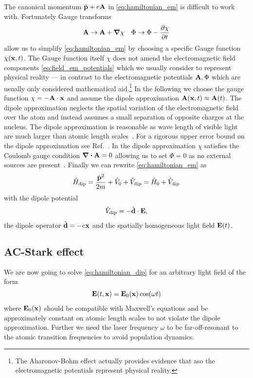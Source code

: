The canonical momentum $\hat{\vb{p}}+e\vb{A}$ in \cref{eq:hamiltonian_em} is
difficult to work with. Fortunately Gauge transforms
\begin{align}
  \vb{A}\to\vb{A}+\grad{\chi}
  &&
  \Phi\to\Phi-\pdv{\chi}{t}
  \label{eq:gauge_transform_em}
\end{align}
allow us to simplify \cref{eq:hamiltonian_em} by choosing a specific Gauge
function $\chi(\vb{x},t)$. The Gauge function itself $\chi$ does not amend the
electromagnetic field components \cref{eq:field_em_potentials} which we
usually consider to represent physical reality --- in contrast to the
electromagnetic potentials $\vb{A},\Phi$ which are usually only considered
mathematical aid.\footnote{The Aharonov-Bohm effect actually provides evidence
that aso the electromagnetic potentials represent physical reality.} In the
following we choose the gauge function $\chi=-\vb{A}\cdot\vb{x}$ and assume
the dipole approximation $\vb{A}(\vb{x},t)\approx\vb{A}(t)$. The dipole
approximation neglects the spatial variation of the electromagnetic field
over the atom and instead assumes a small separation of opposite charges at
the nucleus. The dipole approximation is reasonable as wave length of visible
light are much larger than atomic length scales~\cite{Gerry2004}. For a
rigorous upper error bound on the dipole approximation see
Ref.~\cite{Bossmann2016}. In the dipole approximation $\chi$ satisfies the
Coulomb gauge condition $\divergence{\vb{A}}=0$ allowing us to set $\Phi=0$
as no external sources are present~\cite{Jackson2005}. Finally we can rewrite
\cref{eq:hamiltonian_em} as
\begin{equation}
  \hat{H}_\text{dip}
  =\frac{\hat{\vb{p}}^2}{2m}+\hat{V}_0+\hat{V}_\text{dip}
  =\hat{H}_0+\hat{V}_\text{dip}
  \label{eq:hamiltonian_dip}
\end{equation}
with the dipole potential
\begin{equation}
  \hat{V}_\text{dip}
  =-\hat{\vb{d}}\cdot\vb{E}
  \label{eq:potential_dip},
\end{equation}
the dipole operator $\hat{\vb{d}}=-e\vb{x}$ and the spatially homogeneous
light field $\vb{E}(t)$.

\subsection{AC-Stark effect}

We are now going to solve \cref{eq:hamiltonian_dip} for an arbitrary light
field of the form
\begin{equation}
  \vb{E}(t,\vb{x})
  =\vb{E}_0(\vb{x})\cos(\omega t)
  \label{eq:light_field}
\end{equation}
where $\vb{E}_0(\vb{x})$ should be compatible with Maxwell's equations and
be approximately constant on atomic length scales to not violate the dipole
approximation. Further we need the laser frequency $\omega$ to be
far-off-resonant to the atomic transition frequencies to avoid population
dynamics.


